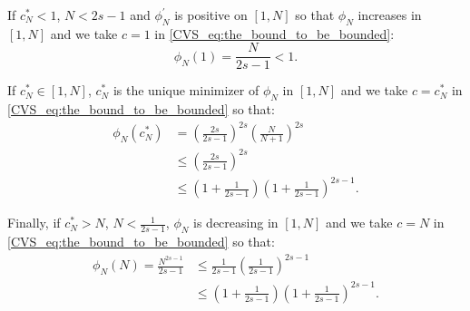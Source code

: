 \documentclass[twoside,11pt]{book}
\numberwithin{theorem}{chapter}
\numberwithin{definition}{chapter}
\numberwithin{proposition}{chapter}
\numberwithin{corollary}{chapter}
\numberwithin{example}{chapter}
\numberwithin{lemma}{chapter}
\numberwithin{assumption}{chapter}
\numberwithin{equation}{chapter}
\numberwithin{figure}{chapter}
\newcommand{\pc}[1]{\textcolor{blue}{#1}}
\newcommand{\rb}[1]{\textcolor{magenta}{#1}}
\begin{document}
If $c_{N}^{*}< 1$, $N < 2s-1$ and $\phi_{N}^{'}$ is positive on $[1,N]$ so that $\phi_{N}$ increases in $[1,N]$ and we take $c = 1$ in \eqref{CVS_eq:the_bound_to_be_bounded}:
\begin{equation}
\phi_{N}(1) = \frac{N}{2s-1} < 1.
\end{equation}

If $c_{N}^{*} \in [1,N]$, $c_{N}^{*}$ is the unique minimizer of $\phi_{N}$ in $[1,N]$ and we take $c = c_{N}^{*}$ in \eqref{CVS_eq:the_bound_to_be_bounded} so that: 
\begin{align}
\phi_{N}(c_{N}^{*}) &= \left(\frac{2s}{2s-1}\right)^{2s} \left(\frac{N}{N+1}\right)^{2s}\\
& \leq \left(\frac{2s}{2s-1}\right)^{2s}\\
& \leq \left(1+\frac{1}{2s-1}\right)\left(1+\frac{1}{2s-1}\right)^{2s-1}.
\label{CVS_e:useful_for_limits_as_well}
\end{align}

Finally, if $c_{N}^{*} > N$, $N < \frac{1}{2s-1}$, $\phi_{N}$ is decreasing in $[1,N]$ and we take $c = N$ in \eqref{CVS_eq:the_bound_to_be_bounded} so that:
\begin{align}
\phi_{N}(N) = \frac{N^{2s-1}}{2s-1} &\leq \frac{1}{2s-1} \left(\frac{1}{2s-1}\right)^{2s-1} \\
&\leq \left(1+\frac{1}{2s-1}\right) \left(1+\frac{1}{2s-1}\right)^{2s-1}. \label{CVS_e:useful_for_limits}
\end{align}





\end{document}
